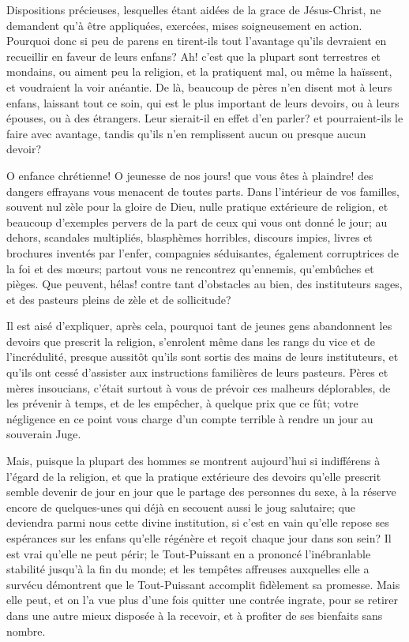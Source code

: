 \documentclass[instructions.tex]{subfiles}
\begin{document}
Dispositions précieuses, lesquelles étant aidées de la grace de Jésus-Christ, ne demandent qu'à être appliquées, exercées, mises soigneusement en action. Pourquoi donc si peu de parens en tirent-ils tout l'avantage qu'ils devraient en recueillir en faveur de leurs enfans? Ah! c'est que la plupart sont terrestres et mondains, ou aiment peu la religion, et la pratiquent mal, ou même la haïssent, et voudraient la voir anéantie. De là, beaucoup de pères n'en disent mot à leurs enfans, laissant tout ce soin, qui est le plus important de leurs devoirs, ou à leurs épouses, ou à des étrangers. Leur sierait-il en effet d'en parler? et pourraient-ils le faire avec avantage, tandis qu'ils n'en remplissent aucun ou presque aucun devoir?
 
O enfance chrétienne! O jeunesse de nos jours! que vous êtes à plaindre! des dangers effrayans vous menacent de toutes parts. Dans l'intérieur de vos familles, souvent nul zèle pour la gloire de Dieu, nulle pratique extérieure de religion, et beaucoup d'exemples pervers de la part de ceux qui vous ont donné le jour; au dehors, scandales multipliés, blasphèmes horribles, discours impies, livres et brochures inventés par l'enfer, compagnies séduisantes, également corruptrices de la foi et des mœurs; partout vous ne rencontrez qu'ennemis, qu'embûches et pièges. Que peuvent, hélas! contre tant d'obstacles au bien, des instituteurs sages, et des pasteurs pleins de zèle et de sollicitude?
 
Il est aisé d'expliquer, après cela, pourquoi tant de jeunes gens abandonnent les devoirs que prescrit la religion, s'enrolent même dans les rangs du vice et de l'incrédulité, presque aussitôt qu'ils sont sortis des mains de leurs instituteurs, et qu'ils ont cessé d'assister aux instructions familières de leurs pasteurs. Pères et mères insoucians, c'était surtout à vous de prévoir ces malheurs déplorables, de les prévenir à temps, et de les empêcher, à quelque prix que ce fût; votre négligence en ce point vous charge d'un compte terrible à rendre un jour au souverain Juge.
 
Mais, puisque la plupart des hommes se montrent aujourd'hui si indifférens à l'égard de la religion, et que la pratique extérieure des devoirs qu'elle prescrit semble devenir de jour en jour que le partage des personnes du sexe, à la réserve encore de quelques-unes qui déjà en secouent aussi le joug salutaire; que deviendra parmi nous cette divine institution, si c'est en vain qu'elle repose ses espérances sur les enfans qu'elle régénère et reçoit chaque jour dans son sein? Il est vrai qu'elle ne peut périr; le Tout-Puissant en a prononcé l'inébranlable stabilité jusqu'à la fin du monde; et les tempêtes affreuses auxquelles elle a survécu démontrent que le Tout-Puissant accomplit fidèlement sa promesse. Mais elle peut, et on l'a vue plus d'une fois quitter une contrée ingrate, pour se retirer dans une autre mieux disposée à la recevoir, et à profiter de ses bienfaits sans nombre.
 
\end{document}
